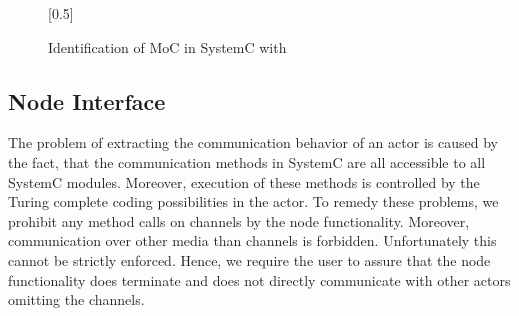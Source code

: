 \begin{figure}[h]
\centering
\scalebox{0.5}[0.5]{}
\caption{Identification of MoC in SystemC with \SysteMoC}
\label{fig:ng-moc-identification}
\end{figure}

%

\subsection{Node Interface}
The problem of extracting the communication behavior of an actor is caused
by the fact, that the communication methods in SystemC are all accessible
to all SystemC modules. Moreover, execution of these methods is controlled
by the Turing complete coding possibilities in the actor. To remedy these
problems, we prohibit any method calls on \SysteMoC{} channels
by the node functionality. Moreover,
communication over other media than \SysteMoC{} channels is forbidden.
Unfortunately this cannot be strictly enforced. Hence, we require the \SysteMoC{} user
to assure that the node functionality does terminate and does not
directly communicate with other actors omitting the \SysteMoC{} channels.


